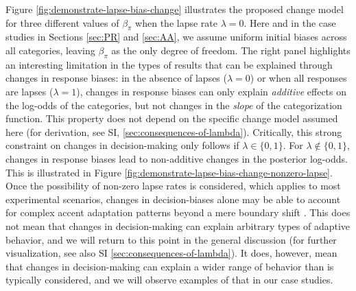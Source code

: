 \documentclass[
  11pt,
  man,floatsintext]{apa6}
\begin{document}
Figure \ref{fig:demonstrate-lapse-bias-change} illustrates the proposed change model for three different values of \(\beta_{\pi}\) when the lapse rate \(\lambda=0\). Here and in the case studies in Sections \ref{sec:PR} and \ref{sec:AA}, we assume uniform initial biases across all categories, leaving \(\beta_{\pi}\) as the only degree of freedom. The right panel highlights an interesting limitation in the types of results that can be explained through changes in response biases: in the absence of lapses (\(\lambda=0\)) or when all responses are lapses (\(\lambda=1\)), changes in response biases can only explain \emph{additive} effects on the log-odds of the categories, but not changes in the \emph{slope} of the categorization function. This property does not depend on the specific change model assumed here (for derivation, see SI, \ref{sec:consequences-of-lambda}). Critically, this strong constraint on changes in decision-making only follows if \(\lambda \in \{0,1\}\). For \(\lambda \not\in \{0,1\}\), changes in response biases lead to non-additive changes in the posterior log-odds. This is illustrated in Figure \ref{fig:demonstrate-lapse-bias-change-nonzero-lapse}. Once the possibility of non-zero lapse rates is considered, which applies to most experimental scenarios, changes in decision-biases alone may be able to account for complex accent adaptation patterns beyond a mere boundary shift \autocite[e.g.,][]{xie2016jep}. This does not mean that changes in decision-making can explain arbitrary types of adaptive behavior, and we will return to this point in the general discussion (for further visualization, see also SI \ref{sec:consequences-of-lambda}). It does, however, mean that changes in decision-making can explain a wider range of behavior than is typically considered, and we will observe examples of that in our case studies.
\end{document}
